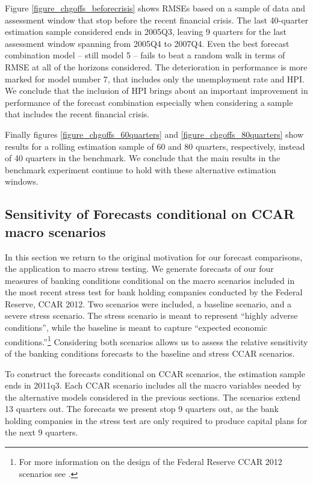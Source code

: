 \documentclass[12pt]{article}
\begin{document}
Figure \ref{figure_chgoffs_beforecrisis} shows RMSEs based on a
sample of data and assessment window that stop before the recent
financial crisis. The last 40-quarter estimation sample considered
ends in 2005Q3, leaving 9 quarters for the last assessment window
spanning from 2005Q4 to 2007Q4. Even the best forecast combination
model -- still model 5 -- fails to beat a random walk in terms of
RMSE at all of the horizons considered.  The deterioration in
performance is more marked for model number 7, that includes only
the unemployment rate and HPI. We conclude that the inclusion of
HPI brings about an important improvement in performance of the
forecast combination especially when considering a sample that
includes the recent financial crisis.

Finally figures \ref{figure_chgoffs_60quarters} and
\ref{figure_chgoffs_80quarters} show results for a rolling
estimation sample of 60 and 80 quarters, respectively, instead of
40 quarters in the benchmark. We conclude that the main results in
the benchmark experiment continue to hold with these alternative
estimation windows.

\subsection{Sensitivity of Forecasts conditional on CCAR macro scenarios}

In this section we return to the original motivation for our
forecast comparisons, the application to macro stress testing. We
generate forecasts of our four measures of banking conditions
conditional on the macro scenarios included in the most recent
stress test for bank holding companies conducted by the Federal
Reserve, CCAR 2012. Two scenarios were included, a baseline
scenario, and a severe stress scenario. The stress scenario is
meant to represent ``highly adverse conditions'', while the
baseline is meant to capture ``expected economic
conditions.''\footnote{For more information on the design of the
Federal Reserve CCAR 2012 scenarios see .}
Considering both scenarios allows us to assess the relative
sensitivity of the banking conditions forecasts to the baseline
and stress CCAR scenarios.

To construct the  forecasts conditional on CCAR scenarios, the
estimation sample ends in 2011q3. Each CCAR scenario includes all
the macro variables needed by the alternative models considered in
the previous sections. The scenarios extend 13 quarters out. The
forecasts we present stop 9 quarters out, as the bank holding
companies in the stress test are only required to produce capital
plans for the next 9 quarters.
\end{document}
